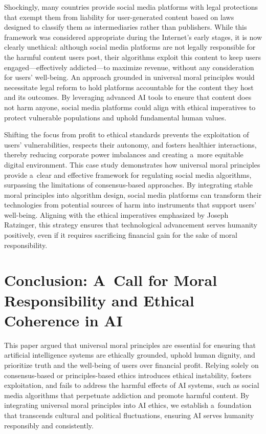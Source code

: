 \documentclass[%
  manuscript=article,
  year=2024,
  volume=77,
  doi=10.59203/zfn.77.707,
]{zfn}
\begin{document}
Shockingly, many countries provide social media platforms with legal protections that exempt them from liability for user-generated content based on laws designed to classify them as intermediaries rather than publishers. While this framework was considered appropriate during the Internet's early stages, it is now clearly unethical: although social media platforms are not legally responsible for the harmful content users post, their algorithms exploit this content to keep users engaged---effectively addicted---to maximize revenue, without any consideration for users' well-being. An approach grounded in universal moral principles would necessitate legal reform to hold platforms accountable for the content they host and its outcomes. By leveraging advanced AI tools to ensure that content does not harm anyone, social media platforms could align with ethical imperatives to protect vulnerable populations and uphold fundamental human values.



Shifting the focus from profit to ethical standards prevents the exploitation of users' vulnerabilities, respects their autonomy, and fosters healthier interactions, thereby reducing corporate power imbalances and creating a~more equitable digital environment. This case study demonstrates how universal moral principles provide a~clear and effective framework for regulating social media algorithms, surpassing the limitations of consensus-based approaches. By integrating stable moral principles into algorithm design, social media platforms can transform their technologies from potential sources of harm into instruments that support users' well-being. Aligning with the ethical imperatives emphasized by Joseph Ratzinger, this strategy ensures that technological advancement serves humanity positively, even if it requires sacrificing financial gain for the sake of moral responsibility.



\section{Conclusion: A~Call for Moral Responsibility and Ethical Coherence in AI}



This paper argued that universal moral principles are essential for ensuring that artificial intelligence systems are ethically grounded, uphold human dignity, and prioritize truth and the well-being of users over financial profit. Relying solely on consensus-based or principles-based ethics introduces ethical instability, fosters exploitation, and fails to address the harmful effects of AI systems, such as social media algorithms that perpetuate addiction and promote harmful content. By integrating universal moral principles into AI ethics, we establish a~foundation that transcends cultural and political fluctuations, ensuring AI serves humanity responsibly and consistently.
\end{document}
